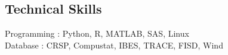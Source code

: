 \documentclass[margin]{res}
\begin{document}
\begin{resume}
%

\section{\sc Technical Skills}

Programming : Python, R, MATLAB, SAS, Linux
\\
Database : CRSP, Compustat, IBES, TRACE, FISD, Wind



\end{resume}
\(\)
\end{document}
